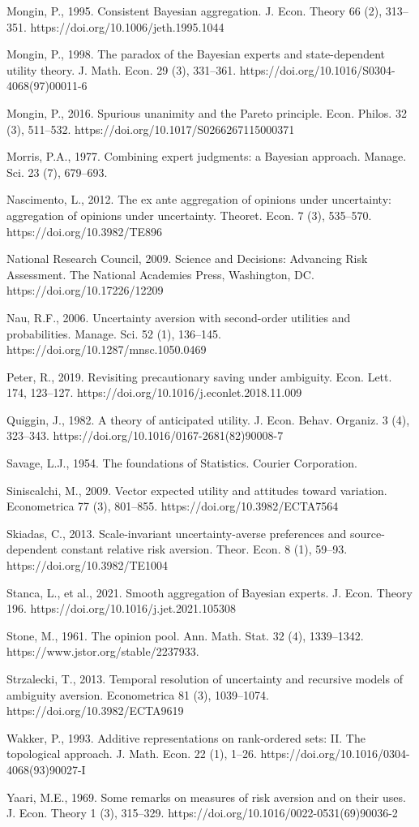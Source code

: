 \documentclass[12pt,a4paper]{article}
\newenvironment{original}
  {\par\noindent\ignorespaces}
  {\par}
\begin{document}
\begin{original}
Mongin, P., 1995. Consistent Bayesian aggregation. J. Econ. Theory 66 (2), 313--351. https://doi.org/10.1006/jeth.1995.1044

Mongin, P., 1998. The paradox of the Bayesian experts and state-dependent utility theory. J. Math. Econ. 29 (3), 331--361. https://doi.org/10.1016/S0304-4068(97)00011-6

Mongin, P., 2016. Spurious unanimity and the Pareto principle. Econ. Philos. 32 (3), 511--532. https://doi.org/10.1017/S0266267115000371

Morris, P.A., 1977. Combining expert judgments: a Bayesian approach. Manage. Sci. 23 (7), 679--693.

Nascimento, L., 2012. The ex ante aggregation of opinions under uncertainty: aggregation of opinions under uncertainty. Theoret. Econ. 7 (3), 535--570. https://doi.org/10.3982/TE896

National Research Council, 2009. Science and Decisions: Advancing Risk Assessment. The National Academies Press, Washington, DC. https://doi.org/10.17226/12209

Nau, R.F., 2006. Uncertainty aversion with second-order utilities and probabilities. Manage. Sci. 52 (1), 136--145. https://doi.org/10.1287/mnsc.1050.0469

Peter, R., 2019. Revisiting precautionary saving under ambiguity. Econ. Lett. 174, 123--127. https://doi.org/10.1016/j.econlet.2018.11.009

Quiggin, J., 1982. A theory of anticipated utility. J. Econ. Behav. Organiz. 3 (4), 323--343. https://doi.org/10.1016/0167-2681(82)90008-7

Savage, L.J., 1954. The foundations of Statistics. Courier Corporation.

Siniscalchi, M., 2009. Vector expected utility and attitudes toward variation. Econometrica 77 (3), 801--855. https://doi.org/10.3982/ECTA7564

Skiadas, C., 2013. Scale-invariant uncertainty-averse preferences and source-dependent constant relative risk aversion. Theor. Econ. 8 (1), 59--93. https://doi.org/10.3982/TE1004

Stanca, L., et al., 2021. Smooth aggregation of Bayesian experts. J. Econ. Theory 196. https://doi.org/10.1016/j.jet.2021.105308

Stone, M., 1961. The opinion pool. Ann. Math. Stat. 32 (4), 1339--1342. https://www.jstor.org/stable/2237933.

Strzalecki, T., 2013. Temporal resolution of uncertainty and recursive models of ambiguity aversion. Econometrica 81 (3), 1039--1074. https://doi.org/10.3982/ECTA9619

Wakker, P., 1993. Additive representations on rank-ordered sets: II. The topological approach. J. Math. Econ. 22 (1), 1--26. https://doi.org/10.1016/0304-4068(93)90027-I

Yaari, M.E., 1969. Some remarks on measures of risk aversion and on their uses. J. Econ. Theory 1 (3), 315--329. https://doi.org/10.1016/0022-0531(69)90036-2

\end{original}

\end{document}
